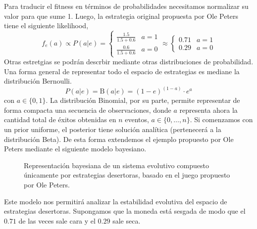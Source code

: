 \documentclass[a4paper,10pt]{article}
\begin{document}
Para traducir el fitness en términos de probabilidades necesitamos normalizar su valor para que sume 1.
Luego, la estrategia original propuesta por Ole Peters tiene el siguiente likelihood,
%
\begin{equation}
f_e(a) \propto  P(a|e) = \begin{cases}
 \frac{1.5}{1.5+0.6} & a = 1 \\
 \frac{0.6}{1.5+0.6} & a = 0
  \end{cases}
  \approx
\begin{cases}
 0.71 & a= 1 \\
 0.29 & a= 0
\end{cases}
\end{equation}
%
Otras estretgias se podrán descrbir mediante otras distribuciones de probabilidad.
Una forma general de representar todo el espacio de estrategias es mediane la distribución Bernoulli.
%
\begin{equation}
P(a|e) = \text{B}(a|e) = (1-e)^{(1-a)} \cdot e^a 
\end{equation}
%
con $a \in \{0,1\}$.
La distribución Binomial, por su parte, permite representar de forma compacta una secuencia de observaciones, donde $a$ representa ahora la cantidad total de éxitos obtenidas en $n$ eventos, $a \in \{0, \dots, n\}$.
Si comenzamos con un prior uniforme, el posterior tiene solución analítica (pertenecerá a la distribución Beta).
De esta forma extendemos el ejemplo propuesto por Ole Peters mediante el siguiente modelo bayesiano.
%
\begin{figure}[H]
\centering
{}
\caption{Representación bayesiana de un sistema evolutivo compuesto únicamente por estrategias desertoras, basado en el juego propuesto por Ole Peters.}
\label{fig:modelo_beta_binomial}
\end{figure}
%
Este modelo nos permitirá analizar la estabilidad evolutiva del espacio de estrategias desertoras. 
Supongamos que la moneda está sesgada de modo que el $0.71$ de las veces sale cara y el $0.29$ sale seca.
\end{document}
